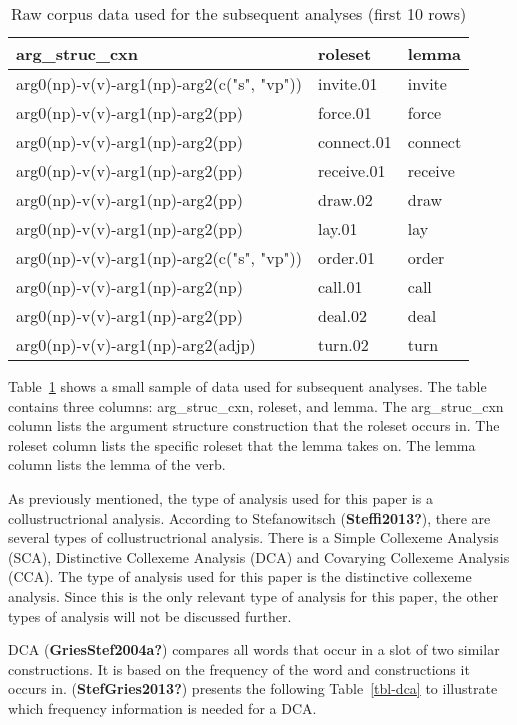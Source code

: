 \documentclass[
  letterpaper,
  DIV=11,
  numbers=noendperiod]{scrartcl}
\begin{document}
\hypertarget{tbl-raw-corpus-data}{}
\begin{table}
\caption{\label{tbl-raw-corpus-data}Raw corpus data used for the subsequent analyses (first 10 rows) }\tabularnewline

\centering
\begin{tabular}[t]{l|l|l}
\hline
arg\_struc\_cxn & roleset & lemma\\
\hline
arg0(np)-v(v)-arg1(np)-arg2(c("s", "vp")) & invite.01 & invite\\
\hline
arg0(np)-v(v)-arg1(np)-arg2(pp) & force.01 & force\\
\hline
arg0(np)-v(v)-arg1(np)-arg2(pp) & connect.01 & connect\\
\hline
arg0(np)-v(v)-arg1(np)-arg2(pp) & receive.01 & receive\\
\hline
arg0(np)-v(v)-arg1(np)-arg2(pp) & draw.02 & draw\\
\hline
arg0(np)-v(v)-arg1(np)-arg2(pp) & lay.01 & lay\\
\hline
arg0(np)-v(v)-arg1(np)-arg2(c("s", "vp")) & order.01 & order\\
\hline
arg0(np)-v(v)-arg1(np)-arg2(np) & call.01 & call\\
\hline
arg0(np)-v(v)-arg1(np)-arg2(pp) & deal.02 & deal\\
\hline
arg0(np)-v(v)-arg1(np)-arg2(adjp) & turn.02 & turn\\
\hline
\end{tabular}
\end{table}

Table~\ref{tbl-raw-corpus-data} shows a small sample of data used for
subsequent analyses. The table contains three columns: arg\_struc\_cxn,
roleset, and lemma. The arg\_struc\_cxn column lists the argument
structure construction that the roleset occurs in. The roleset column
lists the specific roleset that the lemma takes on. The lemma column
lists the lemma of the verb.

As previously mentioned, the type of analysis used for this paper is a
collustructrional analysis. According to Stefanowitsch
(\textbf{Steffi2013?}), there are several types of collustructrional
analysis. There is a Simple Collexeme Analysis (SCA), Distinctive
Collexeme Analysis (DCA) and Covarying Collexeme Analysis (CCA). The
type of analysis used for this paper is the distinctive collexeme
analysis. Since this is the only relevant type of analysis for this
paper, the other types of analysis will not be discussed further.

DCA (\textbf{GriesStef2004a?}) compares all words that occur in a slot
of two similar constructions. It is based on the frequency of the word
and constructions it occurs in. (\textbf{StefGries2013?}) presents the
following Table~\ref{tbl-dca} to illustrate which frequency information
is needed for a DCA.
\end{document}
